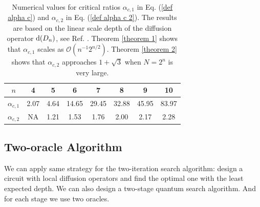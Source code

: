 \documentclass[%
 twocolumn,
 10pt,
 superscriptaddress,
 longbibliography,
 amsmath,amssymb,
 aps,
 pra,
floatfix,
]{revtex4-1}
\begin{document}
\begin{table}[h]
	\begin{ruledtabular}
	\caption{\label{Table 4} Numerical values for critical ratios $\alpha_{c,1}$ in Eq. (\ref{def alpha c}) and $\alpha_{c,2}$ in Eq. (\ref{def alpha c 2}). The results are based on the linear scale depth of the diffusion operator $\text d(D_n)$, see Ref. \cite{BBCDMSSSW95}. Theorem \ref{theorem 1} shows that $\alpha_{c,1}$ scales as $\mathcal O(n^{-1}2^{n/2})$. Theorem \ref{theorem 2} shows that $\alpha_{c,2}$ approaches $1+\sqrt 3$ when $N=2^n$ is very large.}
	
	\begin{tabular}{cccccccc}
		
		$n$ & 4 & 5 & 6 & 7 & 8 & 9 & 10  \\ \hline
		
		$\alpha_{c,1}$ & 2.07 & 4.64 & 14.65 & 29.45 & 32.88 & 45.95 & 83.97  \\
		
		$\alpha_{c,2}$ & NA & 1.21 & 1.53 & 1.76 & 2.00 & 2.17 & 2.28 \\

	\end{tabular}
	
	\end{ruledtabular}
\end{table} 

\subsection{Two-oracle Algorithm}

We can apply same strategy for the two-iteration search algorithm: design a circuit with local diffusion operators and find the optimal one with the least expected depth. We can also design a two-stage quantum search algorithm. And for each stage we use two oracles. 
\end{document}
